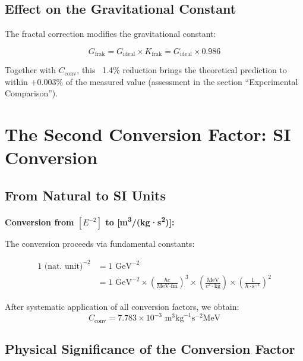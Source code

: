 	\subsection{Effect on the Gravitational Constant}
	
	The fractal correction modifies the gravitational constant:
	
	\begin{equation}
		G_{\text{frak}} = G_{\text{ideal}} \times K_{\text{frak}} = G_{\text{ideal}} \times 0.986
	\end{equation}
	
	Together with $C_{\text{conv}}$, this ~1.4\% reduction brings the theoretical prediction to within $+0.003\%$ of the measured value (assessment in the section \enquote{Experimental Comparison}).
	
	\section{The Second Conversion Factor: SI Conversion}
	
	\subsection{From Natural to SI Units}
	
	\begin{dimensional}
		\textbf{Conversion from $[E^{-2}]$ to [m\textsuperscript{3}/(kg·s\textsuperscript{2})]:}
		
		The conversion proceeds via fundamental constants:
		
		\begin{align}
			1 \text{ (nat. unit)}^{-2} &= 1 \text{ GeV}^{-2} \\
			&= 1 \text{ GeV}^{-2} \times \left(\frac{\hbar c}{\text{MeV·fm}}\right)^3 \times \left(\frac{\text{MeV}}{c^2 \cdot \text{kg}}\right) \times \left(\frac{1}{\hbar \cdot \text{s}^{-1}}\right)^2
		\end{align}
		
		After systematic application of all conversion factors, we obtain:
		\begin{equation}
			C_{\text{conv}} = 7.783 \times 10^{-3} \text{ m}^3\text{kg}^{-1}\text{s}^{-2}\text{MeV}
		\end{equation}
	\end{dimensional}
	
	\subsection{Physical Significance of the Conversion Factor}
	
